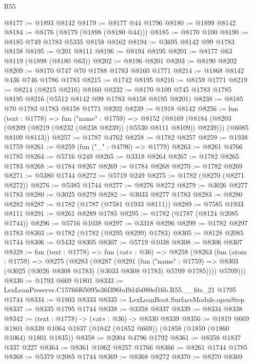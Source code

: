 \begin{lexlean}{R55}
\begin{coremodule}
@8177 := @1893 @8142
@8179 := @8177 @44 @1796
@8180 := @1899 @8142
@8184 := @8176 (@8179 (@1898 (@8180 @44)))
@8185 := @8170 @100
@8190 := @8185 @749 @1783 @5335 @8158 @8162
@8194 := @3695 @8142 @99 @1783 @8158
@8195 := @201 @8111
@8196 := @8194 @8195
@8201 := @8177 @63 @8119 (@1898 (@8180 @63))
@8202 := @8196 @8201
@8203 := @8190 @8202
@8209 := @8170 @747 @70 @1788 @1783 @8160 @1771
@8214 := @1868 @8142 @436 @746 @1786 @1783
@8215 := @1742 @8195
@8216 := @8159 @1771
@8219 := @8214 (@8215 @8216) @8160
@8232 := @8170 @109 @745 @1783 @1785 @8195 @8216 (@5512 @8142 @99 @1783 @8158 @8195 @8201)
@8238 := @8185 @70 @1783 @1783 @8158 @1771 @8202
@8239 := @1918 @8142
@8256 := fun (text : @1778) =>
  fun ("name" : @1759) =>
  @8152
    (@8169
      (@8184 (@8203 (@8209 (@8219 (@8232 (@8238 @8239)) (@5530 @8111 @8109)) @8239)))
      (@6085 @8109 @8113))
@8257 := @1787 @4762
@8258 := @1782 @8257
@8259 := @1938 @1759
@8261 := @8259 (fun ("_" : @4796) => @1779)
@8263 := @8261 @4766 @1785
@8264 := @5716 @249
@8265 := @3318 @8264
@8267 := @1782 @8265 @1783
@8268 := @1784 @8267
@8269 := @1784 @8268
@8270 := @1782 @8269
@8271 := @5380 @1744
@8272 := @5719 @249
@8275 := @1782 (@8270 (@8271 @8272))
@8276 := @5385 @1744
@8277 := @8276 @8272
@8279 := @3026 @8277 @1783
@8280 := @3025 @8279
@8282 := @3033 @8277 @1783
@8283 := @8280 @8282
@8287 := @1782 (@1787 (@7581 @1933 @8111))
@8289 := @7585 @1933 @8111
@8291 := @8261 @8289 @1785
@8295 := @1782 (@1787 (@8124 @2085 @1744))
@8296 := @5716 @1038
@8297 := @3318 @8296
@8299 := @1782 @8297 @1783
@8303 := @1782 (@1782 (@8295 @8299) @1783)
@8305 := @8128 @2085 @1744
@8306 := @5432 @8305
@8307 := @5719 @1038
@8308 := @8306 @8307
@8328 := fun (text : @1778) =>
  fun («at» : @36) =>
  @8258
    (@8263
      (fun (atom : @1759) =>
      @8275
        (@8283
          (@8287
            (@8291
              (fun ("name" : @1759) =>
              @8303 (@3025 (@3026 @8308 @1783) (@3033 @8308 @1783) @5709 @1785))))
          @5709)))
@8330 := @1793 @669 @1801
@8333 := LexLeanPreserve.C15766f65095e36f396bd9d4b080ef16b.R55.__fits_21 @1795 @1744
@8334 := @1803 @8333
@8335 := LexLeanBoot.SurfaceModule.openStep
@8337 := @8335 @1795 @1744
@8338 := @3358 @8337
@8339 := @8334 @8338
@8342 := (text : @1778) -> («at» : @36) -> @8330 @8339
@8356 := @1819
    @669
    @1801
    @8339
    @1064
    @1837
    (@1842 (@1852 @669))
    (@1858 (@1859 (@1860 @1064) @1801 @1835))
@8358 := @2004 @4796 @1792
@8361 := @8358 @1837 @337 @227
@8364 := @8361 @1062 @8257 @1766
@8366 := @8261 @1744 @1785
@8368 := @5379 @2085 @1744
@8369 := @8368 @8272
@8370 := @8270 @8369

\end{coremodule}
\end{lexlean}
